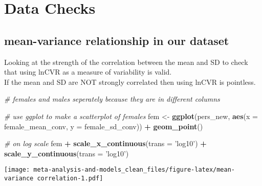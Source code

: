 \documentclass[]{article}
\newenvironment{Shaded}{\begin{snugshade}}{\end{snugshade}}
\newcommand{\KeywordTok}[1]{\textcolor[rgb]{0.13,0.29,0.53}{\textbf{#1}}}
\newcommand{\DataTypeTok}[1]{\textcolor[rgb]{0.13,0.29,0.53}{#1}}
\newcommand{\StringTok}[1]{\textcolor[rgb]{0.31,0.60,0.02}{#1}}
\newcommand{\CommentTok}[1]{\textcolor[rgb]{0.56,0.35,0.01}{\textit{#1}}}
\newcommand{\OperatorTok}[1]{\textcolor[rgb]{0.81,0.36,0.00}{\textbf{#1}}}
\newcommand{\NormalTok}[1]{#1}
\begin{document}
\section{Data Checks}\label{data-checks}

\subsection{mean-variance relationship in our
dataset}\label{mean-variance-relationship-in-our-dataset}

Looking at the strength of the correlation between the mean and SD to
check that using lnCVR as a measure of variability is valid.\\
If the mean and SD are NOT strongly correlated then using lnCVR is
pointless.

\begin{Shaded}
\begin{Highlighting}[]
\CommentTok{# females and males seperately because they are in different columns}
   
   \CommentTok{# use ggplot to make a scatterplot of females}
\NormalTok{    fem <-}\StringTok{ }\KeywordTok{ggplot}\NormalTok{(pers_new, }\KeywordTok{aes}\NormalTok{(}\DataTypeTok{x =}\NormalTok{ female_mean_conv, }\DataTypeTok{y =}\NormalTok{ female_sd_conv)) }\OperatorTok{+}\StringTok{ }\KeywordTok{geom_point}\NormalTok{()}
    
    \CommentTok{# on log scale}
\NormalTok{    fem }\OperatorTok{+}\StringTok{ }\KeywordTok{scale_x_continuous}\NormalTok{(}\DataTypeTok{trans =} \StringTok{'log10'}\NormalTok{) }\OperatorTok{+}\StringTok{ }\KeywordTok{scale_y_continuous}\NormalTok{(}\DataTypeTok{trans =} \StringTok{'log10'}\NormalTok{)}
\end{Highlighting}
\end{Shaded}

\texttt{[image: meta-analysis-and-models\_clean\_files/figure-latex/mean-variance correlation-1.pdf]}

\begin{Shaded}
\end{Shaded}
\end{document}
